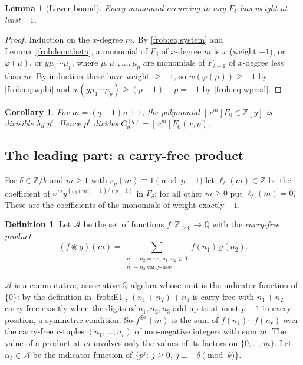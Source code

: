 \documentclass[11pt]{article}
\newtheorem{lemma}[theorem]{Lemma}
\newtheorem{corollary}[theorem]{Corollary}
\theoremstyle{definition}
\newtheorem{definition}[theorem]{Definition}
\theoremstyle{remark}
\numberwithin{equation}{section}
\numberwithin{figure}{section}
\newcommand{\Z}{\mathbb Z}
\newcommand{\Q}{\mathbb Q}
\newcommand{\A}{\mathcal A}
\newcommand{\cf}{\circledast}
\newcommand{\C}{C_n^{(q)}}
\begin{document}
\begin{lemma}[Lower bound]\label{frob:lem:lower}
Every monomial occurring in any $F_\delta$ has weight at least $-1$.
\end{lemma}

\begin{proof}
Induction on the $x$-degree $m$. By \eqref{frob:eq:system} and Lemma~\ref{frob:lem:theta}, a monomial of
$F_\delta$ of $x$-degree $m$ is $x$ (weight $-1$), or $\varphi(\mu)$, or $y\mu_1\cdots\mu_p$,
where $\mu,\mu_1,\dots,\mu_p$ are monomials of $F_{\delta+1}$ of $x$-degree less than $m$. By
induction these have weight $\ge-1$, so $w(\varphi(\mu))\ge-1$ by \eqref{frob:eq:wphi} and
$w(y\mu_1\cdots\mu_p)\ge(p-1)-p=-1$ by \eqref{frob:eq:wprod}.
\end{proof}

\begin{corollary}\label{frob:cor:div}
For $m=(q-1)n+1$, the polynomial $[x^m]F_0\in\Z[y]$ is divisible by $y^t$. Hence $p^t$
divides $\C=[x^m]F_0(x,p)$.
\end{corollary}

\subsection{The leading part: a carry-free product}

For $\delta\in\Z/k$ and $m\ge1$ with $s_p(m)\equiv1\pmod{p-1}$ let $\ell_\delta(m)\in\Z$ be
the coefficient of $x^my^{(s_p(m)-1)/(p-1)}$ in $F_\delta$; for all other $m\ge0$ put
$\ell_\delta(m)=0$. These are the coefficients of the monomials of weight exactly $-1$.

\begin{definition}
Let $\A$ be the set of functions $f\colon\Z_{\ge0}\to\Q$ with the \emph{carry-free product}
\[
 (f\cf g)(m)=\sum_{\substack{n_1+n_2=m,\ n_1,n_2\ge0\\ n_1+n_2\text{ carry-free}}}f(n_1)\,g(n_2).
\]
\end{definition}

$\A$ is a commutative, associative $\Q$-algebra whose unit is the indicator function of
$\{0\}$: by the definition in \ref{frob:E1}, $(n_1+n_2)+n_3$ is carry-free with $n_1+n_2$
carry-free exactly when the digits of $n_1,n_2,n_3$ add up to at most $p-1$ in every
position, a symmetric condition. So $f^{\cf r}(m)$ is the sum of $f(n_1)\cdots f(n_r)$ over
the carry-free $r$-tuples $(n_1,\dots,n_r)$ of non-negative integers with sum $m$. The value
of a product at $m$ involves only the values of its factors on $\{0,\dots,m\}$. Let
$\alpha_\delta\in\A$ be the indicator function of $\{p^j:\ j\ge0,\ j\equiv-\delta\pmod k\}$.
\end{document}
